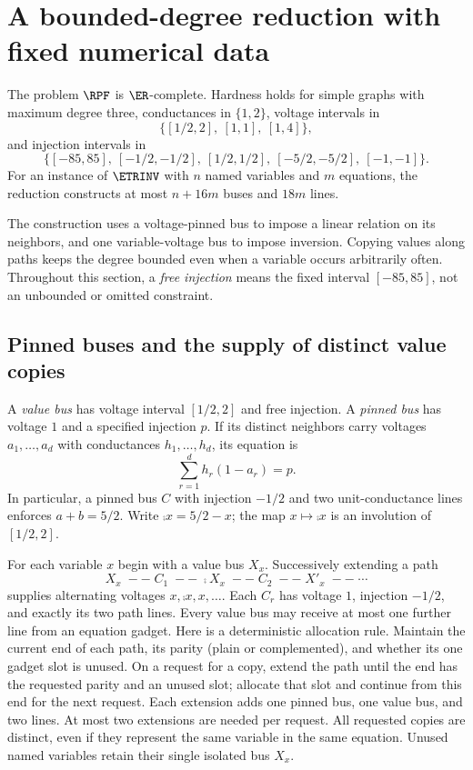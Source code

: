 \section{A bounded-degree reduction with fixed numerical data}
\label{sec:resistive}

\begin{theorem}
\label{thm:rpf-complete}
The problem $\RPF$ is $\ER$-complete. Hardness holds for simple graphs with
maximum degree three, conductances in $\{1,2\}$, voltage intervals in
\[
 \bigl\{[1/2,2],\ [1,1],\ [1,4]\bigr\},
\]
and injection intervals in
\[
 \bigl\{[-85,85],\ [-1/2,-1/2],\ [1/2,1/2],\
 [-5/2,-5/2],\ [-1,-1]\bigr\}.
\]
For an instance of $\ETRINV$ with $n$ named variables and $m$ equations,
the reduction constructs at most $n+16m$ buses and $18m$ lines.
\end{theorem}

The construction uses a voltage-pinned bus to impose a linear relation on
its neighbors, and one variable-voltage bus to impose inversion.
Copying values along paths keeps the degree bounded even when a variable
occurs arbitrarily often. Throughout this section, a \emph{free injection}
means the fixed interval $[-85,85]$, not an unbounded or omitted constraint.

\subsection{Pinned buses and the supply of distinct value copies}
\label{subsec:copies}

A \emph{value bus} has voltage interval $[1/2,2]$ and free injection.
A \emph{pinned bus} has voltage $1$ and a specified injection $p$.
If its distinct neighbors carry voltages $a_1,\ldots,a_d$ with conductances
$h_1,\ldots,h_d$, its equation is
\begin{equation}
 \sum_{r=1}^d h_r(1-a_r)=p.
 \label{eq:pinned}
\end{equation}
In particular, a pinned bus $C$ with injection $-1/2$ and two unit-conductance
lines enforces $a+b=5/2$. Write $\comp{x}=5/2-x$; the map $x\mapsto\comp{x}$
is an involution of $[1/2,2]$.

For each variable $x$ begin with a value bus $X_x$. Successively extending a
path
\begin{equation}
 X_x\;--\; C_1\;--\;\comp{X}_x\;--\;C_2\;--\;X'_x\;--\;\cdots
 \label{eq:copy-chain}
\end{equation}
supplies alternating voltages $x,\comp{x},x,\ldots$.
Each $C_r$ has voltage $1$, injection $-1/2$, and exactly its two path lines.
Every value bus may receive at most one further line from an equation gadget.
Here is a deterministic allocation rule. Maintain the current end of each
path, its parity (plain or complemented), and whether its one gadget slot is
unused. On a request for a copy, extend the path until the end has the requested
parity and an unused slot; allocate that slot and continue from this end for
the next request. Each extension adds one pinned bus, one value bus, and two
lines. At most two extensions are needed per request. All requested copies
are distinct, even if they represent the same variable in the same equation.
Unused named variables retain their single isolated bus $X_x$.

